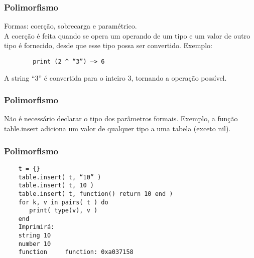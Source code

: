 \begin{frame}[fragile]
  \frametitle{Polimorfismo}
  \begin{block}{}
    \centering
    Formas: coerção, sobrecarga e paramétrico.\\

    A coerção é feita quando se opera um operando de um tipo e um valor
    de outro tipo é fornecido, desde que esse tipo possa ser convertido.
    Exemplo:
    
  \begin{block}{}
    \begin{lstlisting}
        print (2 ^ “3”) –> 6
    \end{lstlisting}
  \end{block}
    
    A string “3” é convertida para o inteiro 3,
    tornando a operação possível.
  \end{block}
\end{frame}

\begin{frame}[fragile]
  \frametitle{Polimorfismo}
  \begin{block}{}
    \centering
Não é necessário declarar o tipo dos parâmetros formais. 
Exemplo, a função table.insert adiciona um valor de qualquer
tipo a uma tabela (exceto nil).
  \end{block}
\end{frame}

\begin{frame}[fragile]
  \frametitle{Polimorfismo}
  \begin{block}{}
    \centering
    \begin{lstlisting}
    t = {}
    table.insert( t, “10” )
    table.insert( t, 10 )
    table.insert( t, function() return 10 end )
    for k, v in pairs( t ) do
       print( type(v), v )
    end
    Imprimirá:
    string 10
    number 10
    function     function: 0xa037158
    \end{lstlisting}
  \end{block}
\end{frame}
